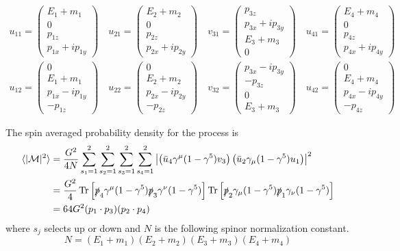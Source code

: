 \documentclass[12pt]{article}
\begin{document}
\begin{gather*}
u_{11}=\begin{pmatrix}E_1+m_1\\0\\p_{1z}\\p_{1x}+ip_{1y}\end{pmatrix}\quad
u_{21}=\begin{pmatrix}E_2+m_2\\0\\p_{2z}\\p_{2x}+ip_{2y}\end{pmatrix}\quad
v_{31}=\begin{pmatrix}p_{3z}\\p_{3x}+ip_{3y}\\E_3+m_3\\0\end{pmatrix}\quad
u_{41}=\begin{pmatrix}E_4+m_4\\0\\p_{4z}\\p_{4x}+ip_{4y}\end{pmatrix}\\
%
u_{12}=\begin{pmatrix}0\\E_1+m_1\\p_{1x}-ip_{1y}\\-p_{1z}\end{pmatrix}\quad
u_{22}=\begin{pmatrix}0\\E_2+m_2\\p_{2x}-ip_{2y}\\-p_{2z}\end{pmatrix}\quad
v_{32}=\begin{pmatrix}p_{3x}-ip_{3y}\\-p_{3z}\\0\\E_3+m_3\end{pmatrix}\quad
u_{42}=\begin{pmatrix}0\\E_4+m_4\\p_{4x}-ip_{4y}\\-p_{4z}\end{pmatrix}
\end{gather*}

\bigskip
\noindent
The spin averaged probability density for the process is
\begin{align*}
\langle|\mathcal{M}|^2\rangle
&=
\frac{G^2}{4N}\sum_{s_1=1}^2\sum_{s_2=1}^2\sum_{s_3=1}^2\sum_{s_4=1}^2
\left|
\left(\bar{u}_4\gamma^\mu(1-\gamma^5)v_3\right)
\left(\bar{u}_2\gamma_\mu(1-\gamma^5)u_1\right)
\right|^2\\
&=\frac{G^2}{4}
\mathop{\text{Tr}}
\left[\slashed{p}_4\gamma^\mu(1-\gamma^5)\slashed{p}_3\gamma^\nu(1-\gamma^5)\right]
\mathop{\text{Tr}}
\left[\slashed{p}_2\gamma_\mu(1-\gamma^5)\slashed{p}_1\gamma_\nu(1-\gamma^5)\right]\\
&=64G^2(p_1\cdot p_3)(p_2\cdot p_4)
\end{align*}
where $s_j$ selects up or down and $N$ is the following spinor normalization constant.
$$
N=(E_1+m_1)(E_2+m_2)(E_3+m_3)(E_4+m_4)
$$
\end{document}
